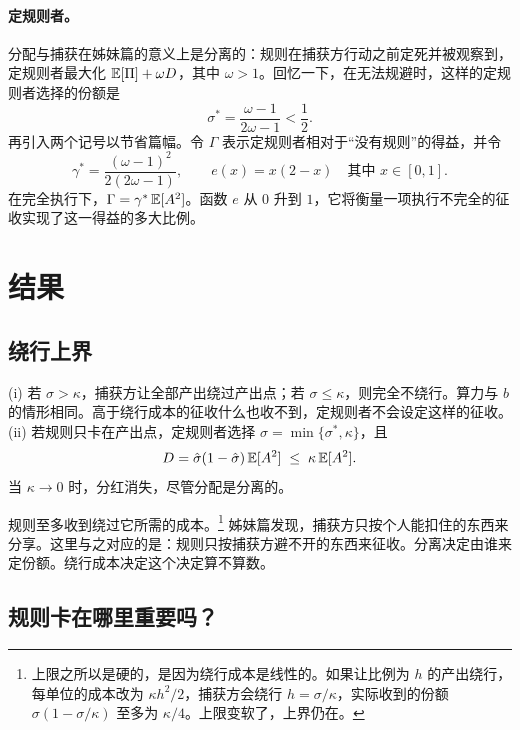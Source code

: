 \paragraph{定规则者。} 分配与捕获在姊妹篇的意义上是分离的：规则在捕获方行动之前定死并被观察到，定规则者最大化 $\mathbb{E}[\Pi]+\omega D$，其中 $\omega>1$。回忆一下，在无法规避时，这样的定规则者选择的份额是
\begin{equation}
  \sigma^*=\frac{\omega-1}{2\omega-1}<\frac12 .
\end{equation}
再引入两个记号以节省篇幅。令 $\Gamma$ 表示定规则者相对于“没有规则”的得益，并令
\begin{equation}
  \gamma^*=\frac{(\omega-1)^2}{2(2\omega-1)}, \qquad e(x)=x(2-x)\quad\text{其中 }x\in[0,1].
\end{equation}
在完全执行下，\allowbreak $\Gamma=\gamma^*\,\mathbb{E}[A^2]$。函数 $e$ 从 $0$ 升到 $1$，它将衡量一项执行不完全的征收实现了这一得益的多大比例。

\section{结果}

\subsection{绕行上界}

\begin{proposition}[绕行上界]\label{prop:bound}
(i) 若 $\sigma>\kappa$，捕获方让全部产出绕过产出点；若 $\sigma\le\kappa$，则完全不绕行。算力与 $b$ 的情形相同。高于绕行成本的征收什么也收不到，定规则者不会设定这样的征收。
(ii) 若规则只卡在产出点，定规则者选择 $\hat\sigma=\min\{\sigma^*,\kappa\}$，且
\begin{equation}
  D=\hat\sigma(1-\hat\sigma)\,\mathbb{E}[A^2]\;\le\;\kappa\,\mathbb{E}[A^2].
\end{equation}
当 $\kappa\to 0$ 时，分红消失，尽管分配是分离的。
\end{proposition}

规则至多收到绕过它所需的成本。\footnote{上限之所以是硬的，是因为绕行成本是线性的。如果让比例为 $h$ 的产出绕行，每单位的成本改为 $\kappa h^2/2$，捕获方会绕行 $h=\sigma/\kappa$，实际收到的份额 $\sigma(1-\sigma/\kappa)$ 至多为 $\kappa/4$。上限变软了，上界仍在。}
姊妹篇发现，捕获方只按个人能扣住的东西来分享。这里与之对应的是：规则只按捕获方避不开的东西来征收。分离决定由谁来定份额。绕行成本决定这个决定算不算数。

\subsection{规则卡在哪里重要吗？}

